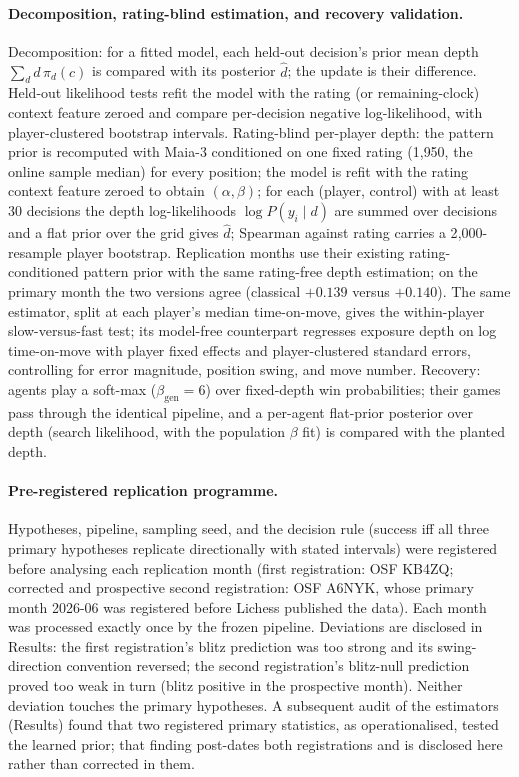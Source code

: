 \paragraph{Decomposition, rating-blind estimation, and recovery validation.}
Decomposition: for a fitted model, each held-out decision's prior mean depth
$\sum_d d\,\pi_d(c)$ is compared with its posterior $\hat d$; the update is their difference.
Held-out likelihood tests refit the model with the rating (or remaining-clock) context feature
zeroed and compare per-decision negative log-likelihood, with player-clustered bootstrap
intervals. Rating-blind per-player depth: the pattern prior is recomputed with Maia-3
conditioned on one fixed rating (1{,}950, the online sample median) for every position; the
model is refit with the rating context feature zeroed to obtain $(\alpha,\beta)$; for each
(player, control) with at least 30 decisions the depth log-likelihoods $\log P(y_i\mid d)$ are
summed over decisions and a flat prior over the grid gives $\hat d$; Spearman against rating
carries a 2{,}000-resample player bootstrap. Replication months use their existing
rating-conditioned pattern prior with the same rating-free depth estimation; on the primary
month the two versions agree (classical $+0.139$ versus $+0.140$). The same estimator, split
at each player's median
time-on-move, gives the within-player slow-versus-fast test; its model-free counterpart
regresses exposure depth on log time-on-move with player fixed effects and player-clustered
standard errors, controlling for error magnitude, position swing, and move number. Recovery:
agents play a soft-max
($\beta_{\text{gen}}{=}6$) over fixed-depth win probabilities; their games pass through the
identical pipeline, and a per-agent flat-prior posterior over depth (search likelihood, with
the population $\beta$ fit) is compared with the planted depth.

\paragraph{Pre-registered replication programme.}
Hypotheses, pipeline, sampling seed, and the decision rule (success iff all three primary
hypotheses replicate directionally with stated intervals) were registered before analysing
each replication month (first registration: OSF KB4ZQ; corrected and prospective second
registration: OSF A6NYK, whose primary month 2026-06 was registered before Lichess published
the data). Each month was processed exactly once by the frozen pipeline. Deviations are
disclosed in Results: the first registration's blitz prediction was too strong and its
swing-direction convention reversed; the second registration's blitz-null prediction proved
too weak in turn (blitz positive in the prospective month). Neither deviation touches the
primary hypotheses. A subsequent audit of the estimators (Results) found that two registered
primary statistics, as operationalised, tested the learned prior; that finding post-dates both
registrations and is disclosed here rather than corrected in them.

